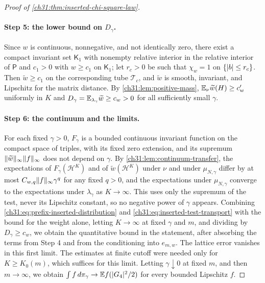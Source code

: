 \begin{proof}[Proof of \cref{ch31:thm:inserted-chi-square-law}]
\paragraph{Step 5: the lower bound on $D_\gamma$.}
Since $w$ is continuous, nonnegative, and not identically zero, there exist a compact invariant set $\mathsf K_1$ with nonempty relative interior in the relative interior of $\mathsf P$ and $c_1>0$ with $w\ge c_1$ on $\mathsf K_1$; let $r_c>0$ be such that $\chi_w=1$ on $\{\lvert b\rvert\le r_c\}$. Then $\widetilde w\ge c_1$ on the corresponding tube $\mathcal T_c$, and $\widetilde w$ is smooth, invariant, and Lipschitz for the matrix distance. By \cref{ch31:lem:positive-mass}, $\mathbb E_\nu\widetilde w(H)\ge c_w'$ uniformly in $K$ and $D_\gamma=\mathbb E_{\lambda_\gamma}\widetilde w\ge c_w>0$ for all sufficiently small $\gamma$.

\paragraph{Step 6: the continuum and the limits.}
For each fixed $\gamma>0$, $F_\gamma$ is a bounded continuous invariant function on the compact space of triples, with its fixed zero extension, and its supremum $\lVert \widetilde w\rVert_\infty\lVert f\rVert_\infty$ does not depend on $\gamma$. By \cref{ch31:lem:continuum-transfer}, the expectations of $F_\gamma(\mathcal H^K)$ and of $\widetilde w(\mathcal H^K)$ under $\nu$ and under $\mu_{N,\gamma}$ differ by at most $C_{w,q}\lVert f\rVert_\infty\gamma^q$ for any fixed $q>0$, and the expectations under $\mu_{N,\gamma}$ converge to the expectations under $\lambda_\gamma$ as $K\to\infty$. This uses only the supremum of the test, never its Lipschitz constant, so no negative power of $\gamma$ appears. Combining \eqref{ch31:eq:prefix-inserted-distribution} and \eqref{ch31:eq:inserted-test-transport} with the bound for the weight alone, letting $K\to\infty$ at fixed $\gamma$ and $m$, and dividing by $D_\gamma\ge c_w$, we obtain the quantitative bound in the statement, after absorbing the terms from Step 4 and from the conditioning into $e_{m,w}$. The lattice error vanishes in this first limit. The estimates at finite cutoff were needed only for $K\ge K_0(m)$, which suffices for this limit. Letting $\gamma\downarrow0$ at fixed $m$, and then $m\to\infty$, we obtain $\int f\,d\pi_\gamma\to\mathbb E f(\lvert G_4\rvert^2/2)$ for every bounded Lipschitz $f$.


\end{proof}
